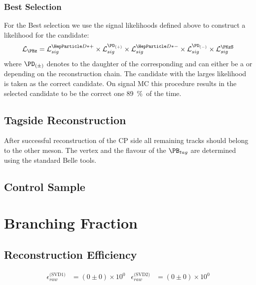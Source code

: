 \documentclass[a4paper]{report}
\def\BestBSelectionEff{\SI{89}{\%}}
\def\RawReconstructionEffSVDOne{(0 \pm 0)\times 10^0}
\def\RawReconstructionEffSVDTwo{(0 \pm 0)\times 10^0}
\begin{document}

\subsection{Best \PB Selection}
\label{sec:bestB}
For the Best \PB selection we use the signal likelihoods defined above to
construct a likelihood for the \PB candidate:
\[
\LH_{\PBz} = \LH_{sig}^{\PDstp} \times \LH_{sig}^{\PD_{(+)}} \times \LH_{sig}^{\PDstm} \times
\LH_{sig}^{\PD_{(-)}} \times \LH_{sig}^{\PKzS}
\]
where $\PD_{(\pm)}$ denotes to the daughter \PD of the corresponding \PDstpm and
can either be a \PDz or \PDpm depending on the reconstruction chain. The \PB
candidate with the larges likelihood is taken as the correct \PB candidate. On
signal MC this procedure results in the selected \PB candidate to be the correct
one \BestBSelectionEff\ of the time.


\section{Tagside Reconstruction}

After successful reconstruction of the CP side all remaining tracks should
belong to the other \PB meson. The vertex and the flavour of the $\PB_{tag}$ are
determined using the standard Belle tools.

\section{Control Sample}

\chapter{Branching Fraction}

\section{Reconstruction Efficiency}

\begin{align}
    \epsilon_{raw}^{\text{(SVD1)}} & = \RawReconstructionEffSVDOne &
    \epsilon_{raw}^{\text{(SVD2)}} & = \RawReconstructionEffSVDTwo
\end{align}
\end{document}
